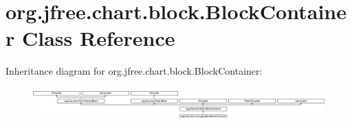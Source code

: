 \hypertarget{classorg_1_1jfree_1_1chart_1_1block_1_1_block_container}{}\section{org.\+jfree.\+chart.\+block.\+Block\+Container Class Reference}
\label{classorg_1_1jfree_1_1chart_1_1block_1_1_block_container}
Inheritance diagram for org.\+jfree.\+chart.\+block.\+Block\+Container\+:\begin{figure}[H]
\begin{center}
\leavevmode
\includegraphics[height=1.338112cm]{classorg_1_1jfree_1_1chart_1_1block_1_1_block_container}
\end{center}
\end{figure}

